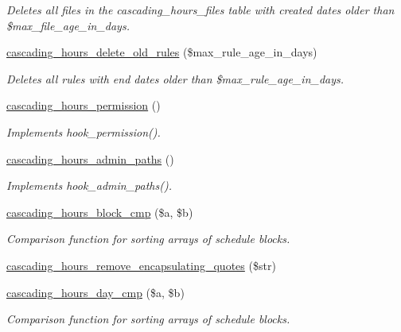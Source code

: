 \begin{DoxyCompactItemize}
\begin{DoxyCompactList}\small\item\em Deletes all files in the cascading\+\_\+hours\+\_\+files table with created dates older than \$max\+\_\+file\+\_\+age\+\_\+in\+\_\+days. \end{DoxyCompactList}\item 
\hyperlink{cascading__hours_8module_a158fbcebea3e8d85e0a90ffed931229b_a158fbcebea3e8d85e0a90ffed931229b}{cascading\+\_\+hours\+\_\+delete\+\_\+old\+\_\+rules} (\$max\+\_\+rule\+\_\+age\+\_\+in\+\_\+days)
\begin{DoxyCompactList}\small\item\em Deletes all rules with end dates older than \$max\+\_\+rule\+\_\+age\+\_\+in\+\_\+days. \end{DoxyCompactList}\item 
\hyperlink{cascading__hours_8module_a02499b5631660505a3967f1dee2606e1_a02499b5631660505a3967f1dee2606e1}{cascading\+\_\+hours\+\_\+permission} ()
\begin{DoxyCompactList}\small\item\em Implements hook\+\_\+permission(). \end{DoxyCompactList}\item 
\hyperlink{cascading__hours_8module_a36f591276bcee018760ce7db1af962e5_a36f591276bcee018760ce7db1af962e5}{cascading\+\_\+hours\+\_\+admin\+\_\+paths} ()
\begin{DoxyCompactList}\small\item\em Implements hook\+\_\+admin\+\_\+paths(). \end{DoxyCompactList}\item 
\hyperlink{cascading__hours_8module_abd21a6ae6b0048e96379f841abca3399_abd21a6ae6b0048e96379f841abca3399}{cascading\+\_\+hours\+\_\+block\+\_\+cmp} (\$a, \$b)
\begin{DoxyCompactList}\small\item\em Comparison function for sorting arrays of schedule blocks. \end{DoxyCompactList}\item 
\hyperlink{cascading__hours_8module_a514bbce69a1a45acfdbbf613c5234e72_a514bbce69a1a45acfdbbf613c5234e72}{cascading\+\_\+hours\+\_\+remove\+\_\+encapsulating\+\_\+quotes} (\$str)
\item 
\hyperlink{cascading__hours_8module_a78cbb6a9ccfd4a10a786970c68b138c0_a78cbb6a9ccfd4a10a786970c68b138c0}{cascading\+\_\+hours\+\_\+day\+\_\+cmp} (\$a, \$b)
\begin{DoxyCompactList}\small\item\em Comparison function for sorting arrays of schedule blocks. \end{DoxyCompactList}\item 

\end{DoxyCompactItemize}
